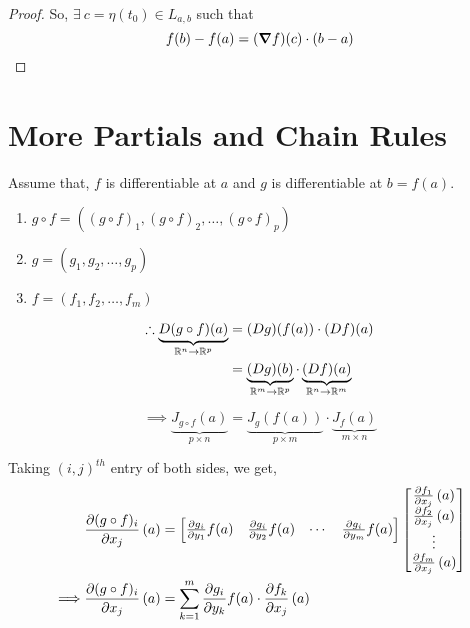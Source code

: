 \documentclass[../Analysis-3]{subfiles}
\begin{document}
\begin{proof}
    So, $\exists\ c = \eta(t_0) \in L_{a,b}$ such that \[ f(b) - f(a) = (\grad f)(c)\cdot(b-a) \]
\end{proof}

\section{More Partials and Chain Rules}

Assume that, $f$ is differentiable at $a$ and $g$ is differentiable at $b = f(a)$.

\begin{notnBox}
    \begin{enumerate}
        \item $g \circ f = \left( (g \circ f)_1, (g \circ f)_2, \ldots, (g \circ f)_p \right)$
        \item $g = \left( g_1, g_2, \ldots, g_p \right)$
        \item $f = \left( f_1, f_2, \ldots, f_m \right)$
    \end{enumerate}
\end{notnBox}

\begin{align*}
    \therefore    \underbrace{D(g \circ f)(a)}_{\mathbb{R}^n \to \mathbb{R}^p} & = (Dg)(f(a))\cdot (Df)(a)                                                        \\
                                                               & = \underbrace{(Dg)(b)}_{\mathbb{R}^m \to \mathbb{R}^p}\cdot \underbrace{(Df)(a)}_{\mathbb{R}^n \to \mathbb{R}^m}
\end{align*}

\[\implies \underbrace{J_{g \circ f}(a)}_{p \times n} = \underbrace{J_{g}(f(a))}_{p \times m}\cdot \underbrace{J_{f}(a)}_{m \times n} \]

Taking $(i,j)^{th}$ entry of both sides, we get,
\begin{align*}
             & \pdv{(g\circ f)_{i}}{x_j}\left( a \right) = \begin{bmatrix}
                                                               \pdv{g_i}{y_1}f(a) & \pdv{g_i}{y_2}f(a) & \cdots & \pdv{g_i}{y_m}f(a)
                                                           \end{bmatrix} \begin{bmatrix}
                                                                             \pdv{f_1}{x_j}\left( a \right) \\
                                                                             \pdv{f_2}{x_j}\left( a \right) \\
                                                                             \vdots                         \\
                                                                             \pdv{f_m}{x_j}\left( a \right)
                                                                         \end{bmatrix}  \\
    \implies & \pdv{(g\circ f)_{i}}{x_j}\left( a \right) = \sum_{k = 1}^{m} \pdv{g_i}{y_k}f(a)\cdot\pdv{f_k}{x_j}\left( a \right)
\end{align*}
\end{document}
